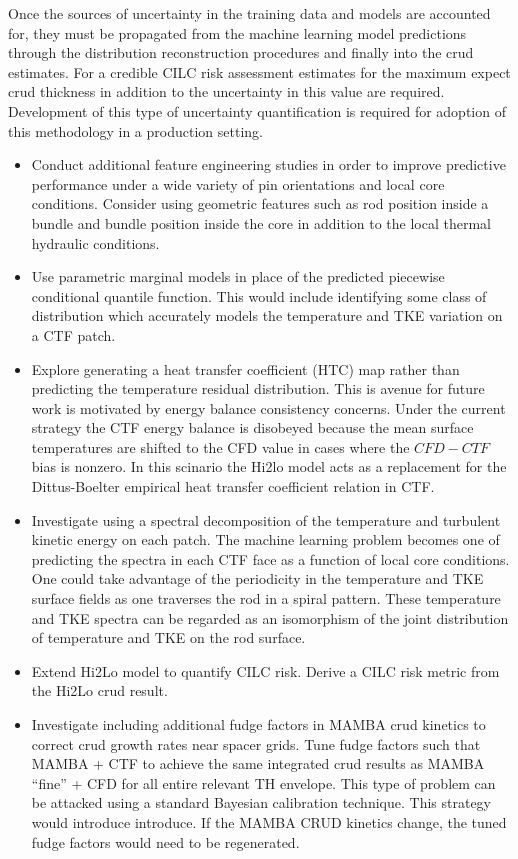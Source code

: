 Once the sources of uncertainty in the training data and models are accounted for, they must be propagated from the machine learning model predictions through the distribution reconstruction procedures and finally into the crud estimates.  For a credible CILC risk assessment estimates for the maximum expect crud thickness in addition to the uncertainty in this value are required. Development of this type of uncertainty quantification is required for adoption of this methodology in a production setting.
    

\begin{itemize}
    \item Conduct additional feature engineering studies in order to improve predictive performance under a wide variety of pin orientations and local core conditions.  Consider using geometric features such as rod position inside a bundle and bundle position inside the core in addition to the local thermal hydraulic conditions.
	
	\item Use parametric marginal models in place of the predicted piecewise conditional quantile function.  This would include identifying some class of distribution which accurately models the temperature and TKE variation on a CTF patch.
	
	\item Explore generating a heat transfer coefficient (HTC) map rather than predicting the temperature residual distribution.  This is avenue for future work is motivated by energy balance consistency concerns.  Under the current strategy the CTF energy balance is disobeyed because the mean surface temperatures are shifted to the CFD value in cases where the $CFD-CTF$ bias is nonzero.  In this scinario the Hi2lo model acts as a replacement for the Dittus-Boelter empirical heat transfer coefficient relation in CTF.
	
	\item Investigate using a spectral decomposition of the temperature and turbulent kinetic energy on each patch.  The machine learning problem becomes one of predicting the spectra in each CTF face as a function of local core conditions.  One could take advantage of the periodicity in the temperature and TKE surface fields as one traverses the rod in a spiral pattern.  These temperature and TKE spectra can be regarded as an isomorphism of the  joint distribution of temperature and TKE on the rod surface.
	
	\item Extend Hi2Lo model to quantify CILC risk.  Derive a CILC risk metric from the Hi2Lo crud result.
	
		\item Investigate including additional fudge factors in MAMBA crud kinetics to correct crud growth rates near spacer grids.  Tune fudge factors such that MAMBA + CTF to achieve the same integrated crud results as MAMBA ``fine'' + CFD for all entire relevant TH envelope.  This type of problem can be attacked using a standard Bayesian calibration technique.   This strategy would introduce introduce.  If the MAMBA CRUD kinetics change, the tuned fudge factors would need to be regenerated.
	
\end{itemize}
